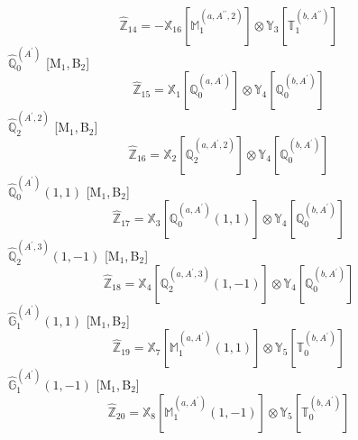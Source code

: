 \documentclass[fleqn,10pt,landscape]{article}
\begin{document}
\begin{itemize}
\begin{dmath*}
\hat{\mathbb{Z}}_{14}=- \mathbb{X}_{16}[\mathbb{M}_{1}^{(a,A^{\prime\prime},2)}] \otimes\mathbb{Y}_{3}[\mathbb{T}_{1}^{(b,A^{\prime\prime})}]
\end{dmath*}
\vspace{4mm}
\noindent {} $\,\,\,\hat{\mathbb{Q}}_{0}^{(A^{\prime})}$ [M$_{1}$,\,B$_{2}$]
\begin{dmath*}
\hat{\mathbb{Z}}_{15}=\mathbb{X}_{1}[\mathbb{Q}_{0}^{(a,A^{\prime})}] \otimes\mathbb{Y}_{4}[\mathbb{Q}_{0}^{(b,A^{\prime})}]
\end{dmath*}
\vspace{4mm}
\noindent {} $\,\,\,\hat{\mathbb{Q}}_{2}^{(A^{\prime},2)}$ [M$_{1}$,\,B$_{2}$]
\begin{dmath*}
\hat{\mathbb{Z}}_{16}=\mathbb{X}_{2}[\mathbb{Q}_{2}^{(a,A^{\prime},2)}] \otimes\mathbb{Y}_{4}[\mathbb{Q}_{0}^{(b,A^{\prime})}]
\end{dmath*}
\vspace{4mm}
\noindent {} $\,\,\,\hat{\mathbb{Q}}_{0}^{(A^{\prime})}(1,1)$ [M$_{1}$,\,B$_{2}$]
\begin{dmath*}
\hat{\mathbb{Z}}_{17}=\mathbb{X}_{3}[\mathbb{Q}_{0}^{(a,A^{\prime})}(1,1)] \otimes\mathbb{Y}_{4}[\mathbb{Q}_{0}^{(b,A^{\prime})}]
\end{dmath*}
\vspace{4mm}
\noindent {} $\,\,\,\hat{\mathbb{Q}}_{2}^{(A^{\prime},3)}(1,-1)$ [M$_{1}$,\,B$_{2}$]
\begin{dmath*}
\hat{\mathbb{Z}}_{18}=\mathbb{X}_{4}[\mathbb{Q}_{2}^{(a,A^{\prime},3)}(1,-1)] \otimes\mathbb{Y}_{4}[\mathbb{Q}_{0}^{(b,A^{\prime})}]
\end{dmath*}
\vspace{4mm}
\noindent {} $\,\,\,\hat{\mathbb{G}}_{1}^{(A^{\prime})}(1,1)$ [M$_{1}$,\,B$_{2}$]
\begin{dmath*}
\hat{\mathbb{Z}}_{19}=\mathbb{X}_{7}[\mathbb{M}_{1}^{(a,A^{\prime})}(1,1)] \otimes\mathbb{Y}_{5}[\mathbb{T}_{0}^{(b,A^{\prime})}]
\end{dmath*}
\vspace{4mm}
\noindent {} $\,\,\,\hat{\mathbb{G}}_{1}^{(A^{\prime})}(1,-1)$ [M$_{1}$,\,B$_{2}$]
\begin{dmath*}
\hat{\mathbb{Z}}_{20}=\mathbb{X}_{8}[\mathbb{M}_{1}^{(a,A^{\prime})}(1,-1)] \otimes\mathbb{Y}_{5}[\mathbb{T}_{0}^{(b,A^{\prime})}]
\end{dmath*}
\vspace{4mm}

\end{itemize}
\end{document}
